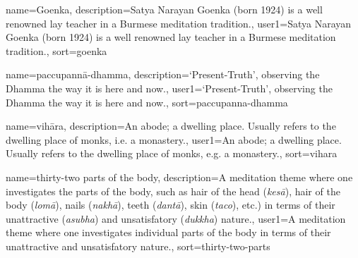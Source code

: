 {
name=Goenka,
description={Satya Narayan Goenka (born 1924) is a well renowned lay teacher in a Burmese meditation tradition.},
user1={Satya Narayan Goenka (born 1924) is a well renowned lay teacher in a Burmese meditation tradition.},
sort={goenka}
}

{
name=paccupann\=a-dhamma,
description={`Present-Truth', observing the Dhamma the way it is here and now.},
user1={`Present-Truth', observing the Dhamma the way it is here and now.},
sort={paccupanna-dhamma}
}

{
name=vih\=ara,
description={An abode; a dwelling place. Usually refers to the dwelling place of monks, i.e. a monastery.},
user1={An abode; a dwelling place. Usually refers to the dwelling place of monks, e.g. a monastery.},
sort={vihara}
}

{
name={thirty-two parts of the body},
description={A meditation theme where one investigates the parts of the body, such as hair of the head (\textit{kes\=a}), hair of the body (\textit{lom\=a}), nails (\textit{nakh\=a}), teeth (\textit{dant\=a}), skin (\textit{taco}), etc.) in terms of their unattractive (\textit{asubha}) and unsatisfatory (\textit{dukkha}) nature.},
user1={A meditation theme where one investigates individual parts of the body in terms of their unattractive and unsatisfatory nature.},
sort={thirty-two-parts}
}
